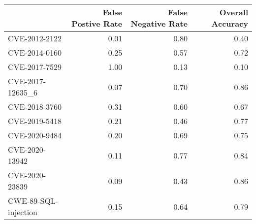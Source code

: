 \begin{tabular}{lrrr}
\toprule
{} &  False Postive Rate &  False Negative Rate &  Overall Accuracy \\
\midrule
CVE-2012-2122        &                0.01 &                 0.80 &              0.40 \\
CVE-2014-0160        &                0.25 &                 0.57 &              0.72 \\
CVE-2017-7529        &                1.00 &                 0.13 &              0.10 \\
CVE-2017-12635\_6     &                0.07 &                 0.70 &              0.86 \\
CVE-2018-3760        &                0.31 &                 0.60 &              0.67 \\
CVE-2019-5418        &                0.21 &                 0.46 &              0.77 \\
CVE-2020-9484        &                0.20 &                 0.69 &              0.75 \\
CVE-2020-13942       &                0.11 &                 0.77 &              0.84 \\
CVE-2020-23839       &                0.09 &                 0.43 &              0.86 \\
CWE-89-SQL-injection &                0.15 &                 0.64 &              0.79 \\
\bottomrule
\end{tabular}

